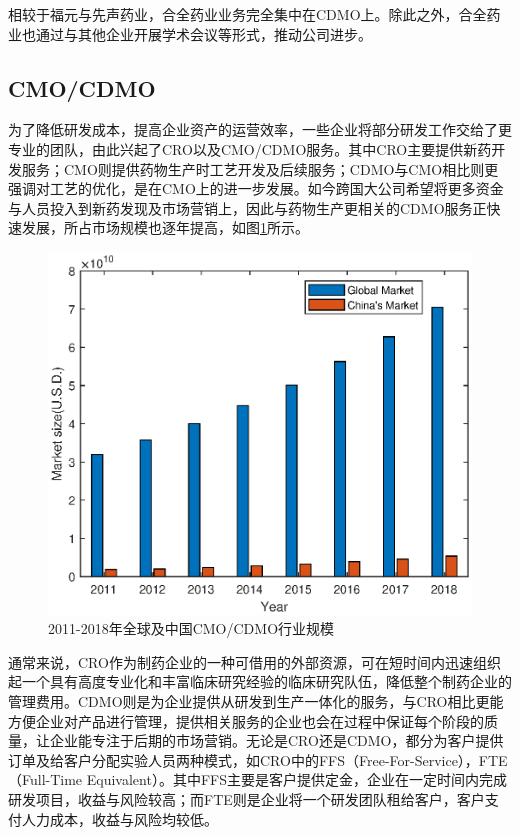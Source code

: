 \documentclass[twocolumn]{ctexbook}
\begin{document}
			相较于福元与先声药业，合全药业业务完全集中在CDMO上。除此之外，合全药业也通过与其他企业开展学术会议等形式，推动公司进步。
			
			
			
			\subsection{CMO/CDMO}
			为了降低研发成本，提高企业资产的运营效率，一些企业将部分研发工作交给了更专业的团队，由此兴起了CRO以及CMO/CDMO服务。其中CRO主要提供新药开发服务；CMO则提供药物生产时工艺开发及后续服务；CDMO与CMO相比则更强调对工艺的优化，是在CMO上的进一步发展。如今跨国大公司希望将更多资金与人员投入到新药发现及市场营销上，因此与药物生产更相关的CDMO服务正快速发展，所占市场规模也逐年提高，如图\ref{fig:fig4}所示\citep{RN25}。
			
			\begin{figure}
				\centering
				\includegraphics[width=1.0\linewidth]{fig4}
				\caption{2011-2018年全球及中国CMO/CDMO行业规模}
				\label{fig:fig4}
			\end{figure}
			
			通常来说，CRO作为制药企业的一种可借用的外部资源，可在短时间内迅速组织起一个具有高度专业化和丰富临床研究经验的临床研究队伍，降低整个制药企业的管理费用\citep{RN10}。CDMO则是为企业提供从研发到生产一体化的服务，与CRO相比更能方便企业对产品进行管理，提供相关服务的企业也会在过程中保证每个阶段的质量，让企业能专注于后期的市场营销。无论是CRO还是CDMO，都分为客户提供订单及给客户分配实验人员两种模式，如CRO中的FFS（Free-For-Service），FTE（Full-Time Equivalent）。其中FFS主要是客户提供定金，企业在一定时间内完成研发项目，收益与风险较高；而FTE则是企业将一个研发团队租给客户，客户支付人力成本，收益与风险均较低。
			
\end{document}
